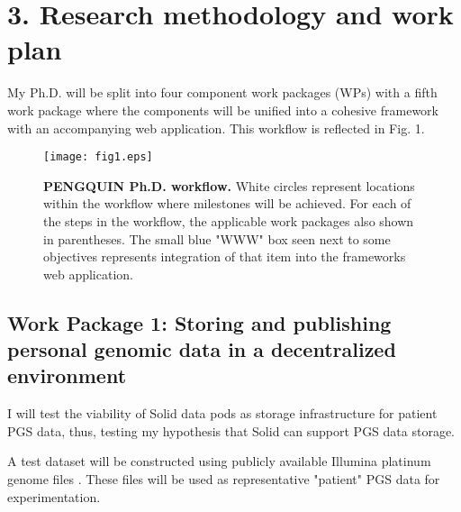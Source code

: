 \documentclass[a4paper,11pt]{article}
\begin{document}
\section{3. Research methodology and work plan}
\begin{comment}
\textit{Elaborate the different envisaged steps (experiments/activities) in your research, and motivate strategic choices in view of reaching the objectives. Describe the set-up and cohesion of the work packages including intermediate goals (milestones).
Show where the proposed methodology (research approach) is according to the state of the art and where it is novel. Discuss risks that might endanger reaching project objectives and the contingency plans to be put in place should this risk occur.
Use a table or graphic representation of the planned course of activities (timing work packages, milestones, critical path) over the 4-years grant period.}
\end{comment}

My Ph.D. will be split into four component work packages (WPs) with a fifth work package where the components will be unified into a cohesive framework with an accompanying web application. This workflow is reflected in Fig. 1.

\begin{figure}
\texttt{[image: fig1.eps]}
\caption{\textbf{PENGQUIN Ph.D. workflow.}
White circles represent locations within the workflow where milestones will be achieved. 
For each of the steps in the workflow, the applicable work packages also shown in parentheses. 
The small blue "WWW" box seen next to some objectives represents integration of that item into the framework\textquotesingle s web application.
} \label{fig1}
\end{figure}

\subsection{Work Package 1: Storing and publishing personal genomic data in a decentralized environment} 

I will test the viability of Solid data pods as storage infrastructure for patient PGS data, thus, testing my hypothesis that Solid can support PGS data storage. 

A test dataset will be constructed using publicly available Illumina platinum genome files \cite{noauthor_platinum_nodate}. 
These files will be used as representative "patient" PGS data for experimentation. 
\end{document}
